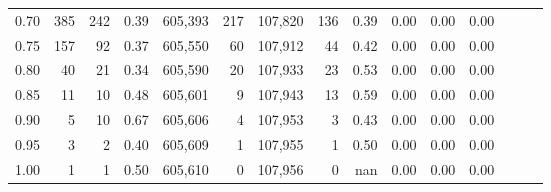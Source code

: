 \begin{tabular}{rrrrrrrrrrrrrrr}
0.70 &      385 &     242 &  0.39 &  605,393 &      217 &  107,820 &      136 &  0.39 &  0.00 &  0.00 &      0.00 \\
0.75 &      157 &      92 &  0.37 &  605,550 &       60 &  107,912 &       44 &  0.42 &  0.00 &  0.00 &      0.00 \\
0.80 &       40 &      21 &  0.34 &  605,590 &       20 &  107,933 &       23 &  0.53 &  0.00 &  0.00 &      0.00 \\
0.85 &       11 &      10 &  0.48 &  605,601 &        9 &  107,943 &       13 &  0.59 &  0.00 &  0.00 &      0.00 \\
0.90 &        5 &      10 &  0.67 &  605,606 &        4 &  107,953 &        3 &  0.43 &  0.00 &  0.00 &      0.00 \\
0.95 &        3 &       2 &  0.40 &  605,609 &        1 &  107,955 &        1 &  0.50 &  0.00 &  0.00 &      0.00 \\
1.00 &        1 &       1 &  0.50 &  605,610 &        0 &  107,956 &        0 &   nan &  0.00 &  0.00 &      0.00 \\
\bottomrule
\end{tabular}
